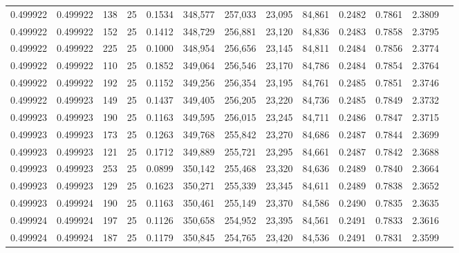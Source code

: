 \begin{tabular}{rrrrrrrrrrrrr}
0.499922 & 0.499922 &   138 &  25 &                                     0.1534 & 348,577 & 257,033 &  23,095 &  84,861 & 0.2482 & 0.7861 & 2.3809 \\
0.499922 & 0.499922 &   152 &  25 &                                     0.1412 & 348,729 & 256,881 &  23,120 &  84,836 & 0.2483 & 0.7858 & 2.3795 \\
0.499922 & 0.499922 &   225 &  25 &                                     0.1000 & 348,954 & 256,656 &  23,145 &  84,811 & 0.2484 & 0.7856 & 2.3774 \\
0.499922 & 0.499922 &   110 &  25 &                                     0.1852 & 349,064 & 256,546 &  23,170 &  84,786 & 0.2484 & 0.7854 & 2.3764 \\
0.499922 & 0.499922 &   192 &  25 &                                     0.1152 & 349,256 & 256,354 &  23,195 &  84,761 & 0.2485 & 0.7851 & 2.3746 \\
0.499922 & 0.499923 &   149 &  25 &                                     0.1437 & 349,405 & 256,205 &  23,220 &  84,736 & 0.2485 & 0.7849 & 2.3732 \\
0.499923 & 0.499923 &   190 &  25 &                                     0.1163 & 349,595 & 256,015 &  23,245 &  84,711 & 0.2486 & 0.7847 & 2.3715 \\
0.499923 & 0.499923 &   173 &  25 &                                     0.1263 & 349,768 & 255,842 &  23,270 &  84,686 & 0.2487 & 0.7844 & 2.3699 \\
0.499923 & 0.499923 &   121 &  25 &                                     0.1712 & 349,889 & 255,721 &  23,295 &  84,661 & 0.2487 & 0.7842 & 2.3688 \\
0.499923 & 0.499923 &   253 &  25 &                                     0.0899 & 350,142 & 255,468 &  23,320 &  84,636 & 0.2489 & 0.7840 & 2.3664 \\
0.499923 & 0.499923 &   129 &  25 &                                     0.1623 & 350,271 & 255,339 &  23,345 &  84,611 & 0.2489 & 0.7838 & 2.3652 \\
0.499923 & 0.499924 &   190 &  25 &                                     0.1163 & 350,461 & 255,149 &  23,370 &  84,586 & 0.2490 & 0.7835 & 2.3635 \\
0.499924 & 0.499924 &   197 &  25 &                                     0.1126 & 350,658 & 254,952 &  23,395 &  84,561 & 0.2491 & 0.7833 & 2.3616 \\
0.499924 & 0.499924 &   187 &  25 &                                     0.1179 & 350,845 & 254,765 &  23,420 &  84,536 & 0.2491 & 0.7831 & 2.3599 \\

\end{tabular}

